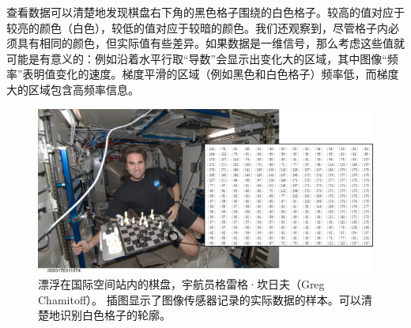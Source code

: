 
查看数据可以清楚地发现棋盘右下角的黑色格子围绕的白色格子。较高的值对应于较亮的颜色（白色），较低的值对应于较暗的颜色。我们还观察到，尽管格子内必须具有相同的颜色，但实际值有些差异。如果数据是一维信号，那么考虑这些值就可能是有意义的：例如沿着水平行取“导数”会显示出变化大的区域，其中图像“频率”表明值变化的速度。梯度平滑的区域（例如黑色和白色格子）频率低，而梯度大的区域包含高频率信息。


\begin{figure}[!htb]
	\centering
		\includegraphics[width=\textwidth]{figs/iss_closeupmatrix}
	\caption{漂浮在国际空间站内的棋盘，宇航员格雷格·坎日夫（Greg Chamitoff）。 插图显示了图像传感器记录的实际数据的样本。可以清楚地识别白色格子的轮廓。}
	\label{fig:iss_closeup}
\end{figure}


